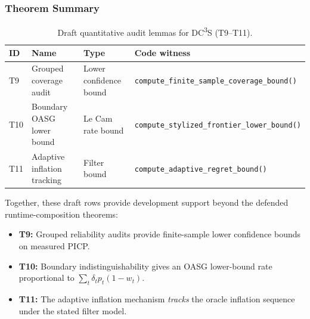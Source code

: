 \subsubsection{Theorem Summary}

\begin{table}[htbp]
\centering\small
\caption{Draft quantitative audit lemmas for DC\textsuperscript{3}S (T9--T11).}
\label{tab:deep_guarantees}
\begin{tabular}{p{1.0cm}p{3.5cm}p{2.5cm}p{4.5cm}}
\toprule
ID & Name & Type & Code witness \\
\midrule
T9  & Grouped coverage audit   & Lower confidence bound & \texttt{compute\_finite\_sample\_coverage\_bound()} \\
T10 & Boundary OASG lower bound & Le Cam rate bound      & \texttt{compute\_stylized\_frontier\_lower\_bound()} \\
T11 & Adaptive inflation tracking & Filter bound         & \texttt{compute\_adaptive\_regret\_bound()} \\
\bottomrule
\end{tabular}
\end{table}

Together, these draft rows provide development support beyond the defended
runtime-composition theorems:
\begin{itemize}[leftmargin=*,topsep=2pt,itemsep=1pt]
  \item \textbf{T9:} Grouped reliability audits provide finite-sample lower
        confidence bounds on measured PICP.
  \item \textbf{T10:} Boundary indistinguishability gives an OASG lower-bound
        rate proportional to $\sum_t \delta_t p_t(1-w_t)$.
  \item \textbf{T11:} The adaptive inflation mechanism \emph{tracks} the
        oracle inflation sequence under the stated filter model.
\end{itemize}

